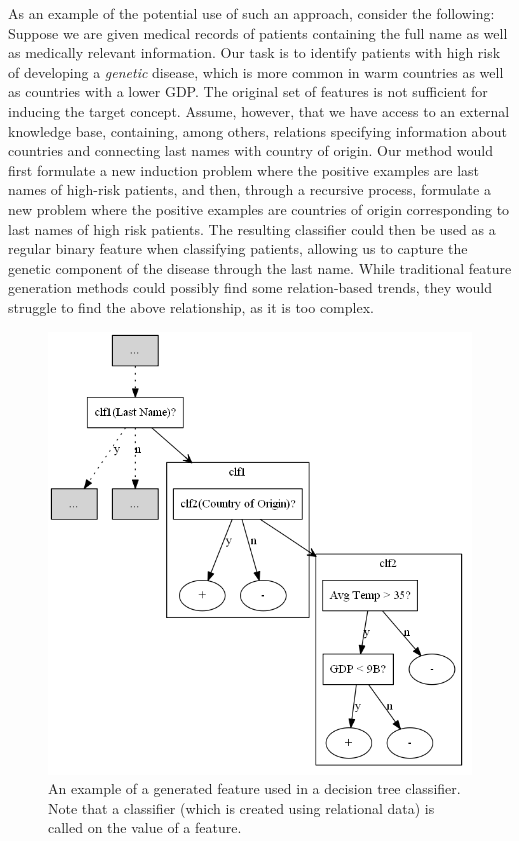 \documentclass{article}
\theoremstyle{definition}
\begin{document}
As an example of the potential use of such an approach, consider the following:
Suppose we are given medical records of patients containing the full name as well as medically relevant information.
Our task is to identify patients with high risk of developing a \emph{genetic} disease, which is more common in warm countries as well as countries with a lower GDP.
The original set of features is not sufficient for inducing the target concept.  Assume, however, that we have access to an external knowledge base, containing, among others, relations specifying information about countries and connecting last names with country of origin.
Our method would first formulate a new induction problem where the positive examples are last names of high-risk patients, and then, through a recursive process, formulate a new problem where the positive examples are countries of origin corresponding to last names of high risk patients. The resulting classifier could then be used as a regular binary feature when classifying patients, allowing us to capture the genetic component of the disease through the last name. While traditional feature generation methods could possibly find some relation-based trends, they would struggle to find the above relationship, as it is too complex.

\begin{figure}[H]
	\centering
	\includegraphics[scale=0.3, keepaspectratio=true]{output.png}
	\caption{An example of a generated feature used in a decision tree classifier. Note that a classifier (which is created using relational data) is called on the value of a feature.}
	\label{fig:example}
\end{figure}
\end{document}
